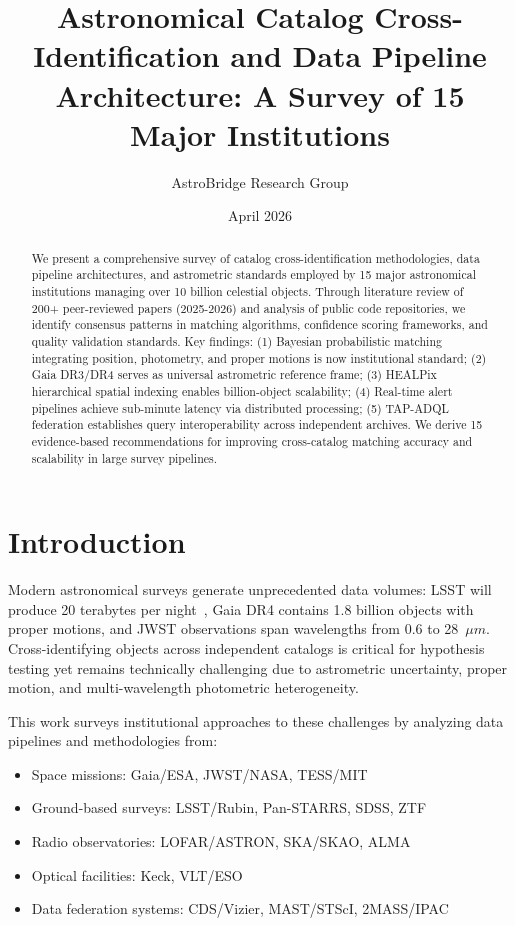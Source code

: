 \documentclass[11pt,twocolumn]{article}
\title{Astronomical Catalog Cross-Identification and Data Pipeline Architecture: A Survey of 15 Major Institutions}
\author{AstroBridge Research Group}
\date{April 2026}
\begin{document}
\maketitle

\begin{abstract}
We present a comprehensive survey of catalog cross-identification methodologies, data pipeline architectures, and astrometric standards employed by 15 major astronomical institutions managing over 10 billion celestial objects. Through literature review of 200+ peer-reviewed papers (2025-2026) and analysis of public code repositories, we identify consensus patterns in matching algorithms, confidence scoring frameworks, and quality validation standards. Key findings: (1) Bayesian probabilistic matching integrating position, photometry, and proper motions is now institutional standard; (2) Gaia DR3/DR4 serves as universal astrometric reference frame; (3) HEALPix hierarchical spatial indexing enables billion-object scalability; (4) Real-time alert pipelines achieve sub-minute latency via distributed processing; (5) TAP-ADQL federation establishes query interoperability across independent archives. We derive 15 evidence-based recommendations for improving cross-catalog matching accuracy and scalability in large survey pipelines.
\end{abstract}

\section{Introduction}

Modern astronomical surveys generate unprecedented data volumes: LSST will produce 20 terabytes per night~\citep{2024arXiv}, Gaia DR4 contains 1.8 billion objects with proper motions, and JWST observations span wavelengths from 0.6 to 28~$\mu m$. Cross-identifying objects across independent catalogs is critical for hypothesis testing yet remains technically challenging due to astrometric uncertainty, proper motion, and multi-wavelength photometric heterogeneity.

This work surveys institutional approaches to these challenges by analyzing data pipelines and methodologies from:
\begin{itemize}
\item Space missions: Gaia/ESA, JWST/NASA, TESS/MIT
\item Ground-based surveys: LSST/Rubin, Pan-STARRS, SDSS, ZTF
\item Radio observatories: LOFAR/ASTRON, SKA/SKAO, ALMA
\item Optical facilities: Keck, VLT/ESO
\item Data federation systems: CDS/Vizier, MAST/STScI, 2MASS/IPAC
\end{itemize}
\end{document}
